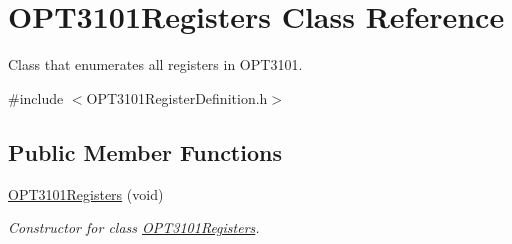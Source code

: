 \hypertarget{class_o_p_t3101_registers}{}\section{O\+P\+T3101\+Registers Class Reference}
\label{class_o_p_t3101_registers}


Class that enumerates all registers in O\+P\+T3101.  




{\ttfamily \#include $<$O\+P\+T3101\+Register\+Definition.\+h$>$}

\subsection*{Public Member Functions}
\begin{DoxyCompactItemize}
\item 
\mbox{\hyperlink{class_o_p_t3101_registers_a2a1e1326298b4b07e7c922ccc0ac0d85}{O\+P\+T3101\+Registers}} (void)
\begin{DoxyCompactList}\small\item\em Constructor for class \mbox{\hyperlink{class_o_p_t3101_registers}{O\+P\+T3101\+Registers}}. \end{DoxyCompactList}\end{DoxyCompactItemize}
